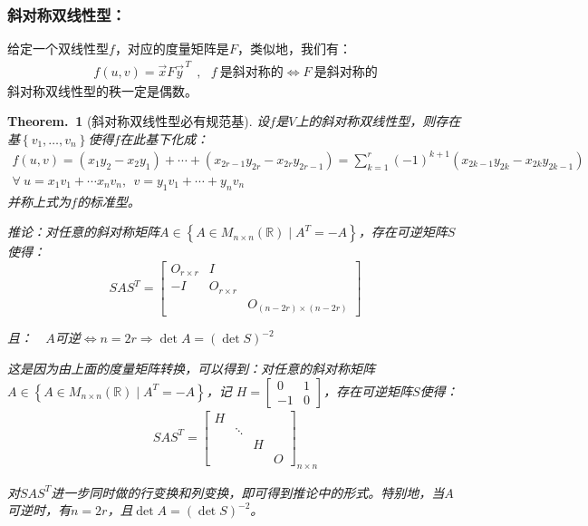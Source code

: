 \documentclass[zihao=5,UTF8]{report}
\theoremstyle{mystyle} %
\newtheorem{theorem}{Theorem.\,}
\begin{document}
\subsubsection{斜对称双线性型：}
给定一个双线性型$f$，对应的度量矩阵是$F$，类似地，我们有：
\begin{gather*}
    f(u,v) = \vec{x}F\vec{y}^{\, T}\ \ ,\ \ \     f\ \text{是斜对称的} \Longleftrightarrow F\ \text{是斜对称的} 
\end{gather*}
{\color{gray}\small 斜对称双线性型的秩一定是偶数。}
\begin{theorem}[斜对称双线性型必有规范基]\label{斜对称双线性型必有规范基}
    设$f$是$V$上的斜对称双线性型，则存在基$\left\{v_1,\dots,v_n\right\}$使得$f$在此基下化成：
    \begin{gather*}
        f(u,v) = (x_1y_2 - x_2y_1) + \cdots + (x_{2r-1}y_{2r} - x_{2r}y_{2r-1}) = \sum_{k = 1}^{r} (-1)^{k+1}(x_{2k-1}y_{2k} - x_{2k}y_{2k-1})\\
        \forall \ u = x_1v_1 + \cdots x_nv_n,\ \ v = y_1v_1 + \cdots + y_nv_n
    \end{gather*}
    并称上式为$f$的标准型。\par
    推论：对任意的斜对称矩阵$A \in \left\{A\in M_{n\times n }(\mathbb{R}) \mid A^T =- A\right\}$，存在可逆矩阵$S$使得：
    \begin{equation*}
        SAS^T = 
        \begin{bmatrix}  
            O_{r\times r} & I &  \\  
            -I & O_{r\times r} &  \\  
             &  & O_{(n-2r)\times (n-2r)}  
          \end{bmatrix} 
    \end{equation*}\par
    且：\ \ $A$可逆$\Longleftrightarrow n=2r \Longrightarrow \det A = (\det S)^{-2}$\par

    {\color{gray}\small 这是因为由上面的度量矩阵转换，可以得到：对任意的斜对称矩阵$A \in \left\{A\in M_{n\times n }(\mathbb{R}) \mid A^T =- A\right\}$，记
    $H = \begin{bmatrix}
        0&1\\
        -1&0
    \end{bmatrix}$，存在可逆矩阵$S$使得：
    \begin{align*}
        SAS^T = \begin{bmatrix}  
            H &  &  &  \\  
             & \ddots &  &  \\  
             &  & H &  \\  
             &  &  & O  
          \end{bmatrix}_{n \times n} 
    \end{align*}\par
    对$SAS^T$进一步同时做的行变换和列变换，即可得到推论中的形式。特别地，当$A$可逆时，有$n = 2r$，且$\det A = (\det S)^{-2}$。}
\end{theorem}
\end{document}
